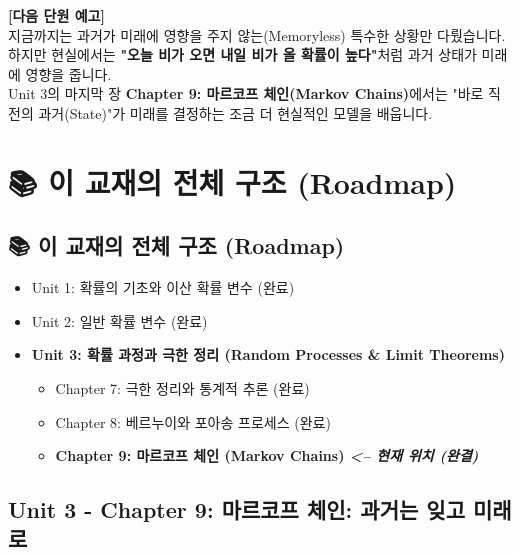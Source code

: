 \documentclass[11pt,a4paper]{book}
\newcommand{\chaptertitle}[2]{\section*{#1: #2}}
\theoremstyle{definition}
\begin{document}
\begin{warningbox}[title={기하 분포와 지수 분포의 관계}]
\vspace{0.5cm}
\textbf{[다음 단원 예고]} \\
지금까지는 과거가 미래에 영향을 주지 않는(Memoryless) 특수한 상황만 다뤘습니다. 하지만 현실에서는 \textbf{"오늘 비가 오면 내일 비가 올 확률이 높다"}처럼 과거 상태가 미래에 영향을 줍니다. \\
Unit 3의 마지막 장 \textbf{Chapter 9: 마르코프 체인(Markov Chains)}에서는 "바로 직전의 과거(State)"가 미래를 결정하는 조금 더 현실적인 모델을 배웁니다.


\chapter{📚 이 교재의 전체 구조 (Roadmap)}
\label{ch:lecture9}



\section*{📚 이 교재의 전체 구조 (Roadmap)}
\begin{itemize}
    \item Unit 1: 확률의 기초와 이산 확률 변수 (완료)
    \item Unit 2: 일반 확률 변수 (완료)
    \item \textbf{Unit 3: 확률 과정과 극한 정리 (Random Processes \& Limit Theorems)}
    \begin{itemize}
        \item Chapter 7: 극한 정리와 통계적 추론 (완료)
        \item Chapter 8: 베르누이와 포아송 프로세스 (완료)
        \item[$\to$] \textbf{\textcolor{mainblue}{Chapter 9: 마르코프 체인 (Markov Chains) \textit{<-- 현재 위치 (완결)}}}
    \end{itemize}
\end{itemize}
\vspace{1cm}

\chaptertitle{Unit 3 - Chapter 9}{마르코프 체인: 과거는 잊고 미래로}


\end{warningbox}
\end{document}
